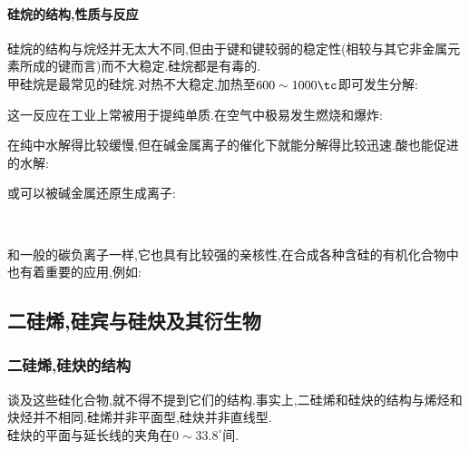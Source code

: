 \documentclass{ctexart}
\begin{document}
\paragraph{硅烷的结构,性质与反应}
硅烷的结构与烷烃并无太大不同,但由于键和键较弱的稳定性(相较与其它非金属元素所成的键而言)而不大稳定.硅烷都是有毒的.\\
\indent 甲硅烷是最常见的硅烷.对热不大稳定,加热至$600\sim1000\tc$即可发生分解:
\begin{center}
\end{center}
这一反应在工业上常被用于提纯单质.在空气中极易发生燃烧和爆炸:
\begin{center}
\end{center}
在纯中水解得比较缓慢,但在碱金属离子的催化下就能分解得比较迅速.酸也能促进的水解:
\begin{center}
\end{center}
或可以被碱金属还原生成\ce{[SiH3]-}离子:
\begin{center}
    \\
\end{center}
和一般的碳负离子一样,它也具有比较强的亲核性,在合成各种含硅的有机化合物中也有着重要的应用,例如:
\begin{center}
\end{center}
\subsection{二硅烯,硅宾与硅炔及其衍生物}
\subsubsection{二硅烯,硅炔的结构}
谈及这些硅化合物,就不得不提到它们的结构.事实上,二硅烯和硅炔的结构与烯烃和炔烃并不相同.硅烯并非平面型,硅炔并非直线型.\\
\indent 硅炔的平面与延长线的夹角在$0\sim33.8^\circ$间.
\end{document}
